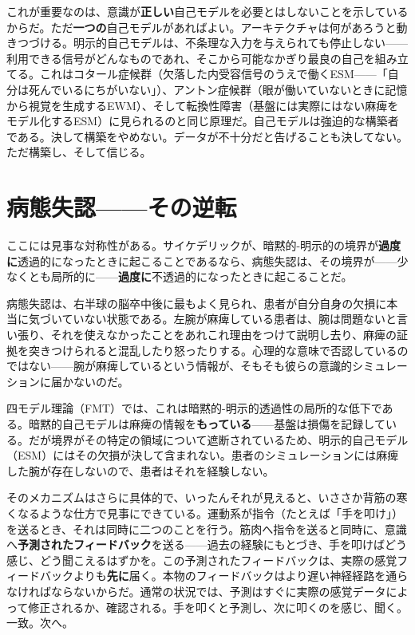 \documentclass[11pt, twoside, openright]{book}
\begin{document}
これが重要なのは、意識が\textbf{正しい}自己モデルを必要とはしないことを示しているからだ。ただ\textbf{一つの}自己モデルがあればよい。アーキテクチャは何があろうと動きつづける。明示的自己モデルは、不条理な入力を与えられても停止しない------利用できる信号がどんなものであれ、そこから可能なかぎり最良の自己を組み立てる。これはコタール症候群（欠落した内受容信号のうえで働くESM------「自分は死んでいるにちがいない」）、アントン症候群（眼が働いていないときに記憶から視覚を生成するEWM）、そして転換性障害（基盤には実際にはない麻痺をモデル化するESM）に見られるのと同じ原理だ。自己モデルは強迫的な構築者である。決して構築をやめない。データが不十分だと告げることも決してない。ただ構築し、そして信じる。

\section*{病態失認------その逆転}

ここには見事な対称性がある。サイケデリックが、暗黙的-明示的の境界が\textbf{過度に}透過的になったときに起こることであるなら、病態失認は、その境界が------少なくとも局所的に------\textbf{過度に}不透過的になったときに起こることだ。

病態失認は、右半球の脳卒中後に最もよく見られ、患者が自分自身の欠損に本当に気づいていない状態である。左腕が麻痺している患者は、腕は問題ないと言い張り、それを使えなかったことをあれこれ理由をつけて説明し去り、麻痺の証拠を突きつけられると混乱したり怒ったりする。心理的な意味で否認しているのではない------腕が麻痺しているという情報が、そもそも彼らの意識的シミュレーションに届かないのだ。

四モデル理論（FMT）では、これは暗黙的-明示的透過性の局所的な低下である。暗黙的自己モデルは麻痺の情報を\textbf{もっている}------基盤は損傷を記録している。だが境界がその特定の領域について遮断されているため、明示的自己モデル（ESM）にはその欠損が決して含まれない。患者のシミュレーションには麻痺した腕が存在しないので、患者はそれを経験しない。

そのメカニズムはさらに具体的で、いったんそれが見えると、いささか背筋の寒くなるような仕方で見事にできている。運動系が指令（たとえば「手を叩け」）を送るとき、それは同時に二つのことを行う。筋肉へ指令を送ると同時に、意識へ\textbf{予測されたフィードバック}を送る------過去の経験にもとづき、手を叩けばどう感じ、どう聞こえるはずかを。この予測されたフィードバックは、実際の感覚フィードバックよりも\textbf{先に}届く。本物のフィードバックはより遅い神経経路を通らなければならないからだ。通常の状況では、予測はすぐに実際の感覚データによって修正されるか、確認される。手を叩くと予測し、次に叩くのを感じ、聞く。一致。次へ。
\end{document}
